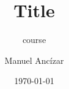 \documentclass[
    xcolor={dvipsnames},
    hyperref={colorlinks=false}
]{beamer}
\title{Title}
\subtitle{course}
\author{Manuel Ancízar}
\institute[UNal]{Facultad de Ciencias\\Universidad Nacional de Colombia}
\date{\today}
\begin{document}
\frame{\titlepage}


\end{document}
